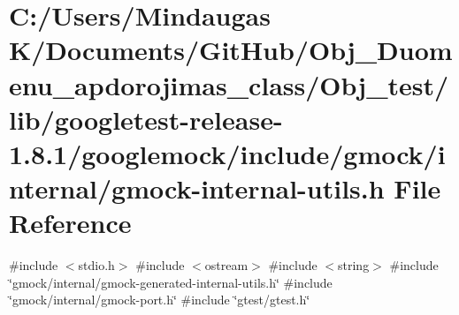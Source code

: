 \hypertarget{_obj__test_2lib_2googletest-release-1_88_81_2googlemock_2include_2gmock_2internal_2gmock-internal-utils_8h}{}\section{C\+:/\+Users/\+Mindaugas K/\+Documents/\+Git\+Hub/\+Obj\+\_\+\+Duomenu\+\_\+apdorojimas\+\_\+class/\+Obj\+\_\+test/lib/googletest-\/release-\/1.8.1/googlemock/include/gmock/internal/gmock-\/internal-\/utils.h File Reference}
\label{_obj__test_2lib_2googletest-release-1_88_81_2googlemock_2include_2gmock_2internal_2gmock-internal-utils_8h}
{\ttfamily \#include $<$stdio.\+h$>$}\newline
{\ttfamily \#include $<$ostream$>$}\newline
{\ttfamily \#include $<$string$>$}\newline
{\ttfamily \#include \char`\"{}gmock/internal/gmock-\/generated-\/internal-\/utils.\+h\char`\"{}}\newline
{\ttfamily \#include \char`\"{}gmock/internal/gmock-\/port.\+h\char`\"{}}\newline
{\ttfamily \#include \char`\"{}gtest/gtest.\+h\char`\"{}}\newline
